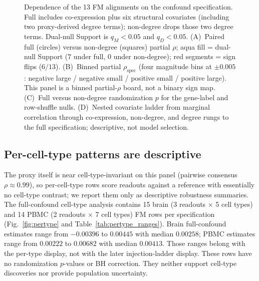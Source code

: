 \documentclass[fleqn,10pt,lineno]{wlpeerj}
\newcommand{\fitfig}[1]{\resizebox{\ifdim\width>\linewidth\linewidth\else\width\fi}{!}{#1}}
\begin{document}
\begin{figure}[!tbp]\centering
\fitfig{}
\caption{Dependence of the 13 FM alignments on the confound specification. Full includes
co-expression plus six structural covariates (including two proxy-derived degree terms);
non-degree drops those two degree terms. Dual-null Support is $q_M<0.05$ and $q_D<0.05$.
(A)~Paired full (circles) versus non-degree (squares) partial $\rho$; aqua fill = dual-null
Support ($7$ under full, $0$ under non-degree); red segments = sign flips ($6/13$). (B)~Binned
partial $\rho_{\mathrm{spec}}$ (four magnitude bins at $\pm0.005$: negative large / negative small /
positive small / positive large). This panel is a binned partial-$\rho$ board, not a binary sign map. (C)~Full versus non-degree randomization $p$ for the gene-label
and row-shuffle nulls. (D)~Nested covariate ladder from marginal correlation through
co-expression, non-degree, and degree rungs to the full specification; descriptive, not model
selection.}\label{fig:spec}
\end{figure}
\FloatBarrier

\subsection{Per-cell-type patterns are descriptive}
The proxy itself is near cell-type-invariant on this panel (pairwise consensus $\rho\approx0.99$),
so per-cell-type rows score readouts against a reference with essentially no cell-type contrast;
we report them only as descriptive robustness summaries. The full-confound cell-type analysis
contains 15 brain (3 readouts $\times$ 5 cell types) and 14 PBMC (2 readouts $\times$ 7 cell
types) FM rows per specification
(Fig.~\ref{fig:pertype} and Table~\ref{tab:pertype_ranges}). Brain full-confound estimates range from $-0.00396$ to $0.00445$ with
median $0.00258$; PBMC estimates range from $0.00222$ to $0.00682$ with median $0.00413$.
Those ranges belong with the per-type display, not with the later injection-ladder display.
These
rows have no randomization $p$-values or BH correction. They neither support cell-type
discoveries nor provide population uncertainty.
\end{document}
